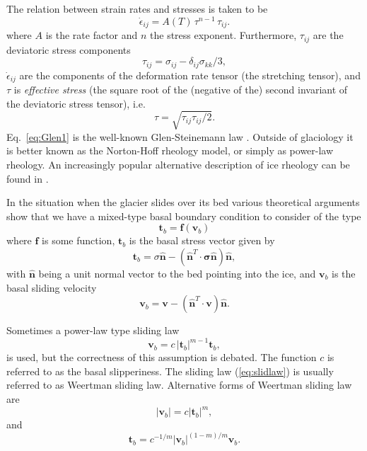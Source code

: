 \documentclass[10pt,a4paper]{book}
\newcommand{\p}{\partial}
\newcommand{\eij}{\dot{\epsilon}_{ij}}
\newcommand{\txy}{\tau_{xy}}
\newcommand{\txz}{\tau_{xz}}
\newcommand{\sxx}{\sigma_{xx}}
\newcommand{\syy}{\sigma_{yy}}
\newcommand{\szz}{\sigma_{zz}}
\newcommand{\normal}{\hat{\bm{n}}}
\begin{document}
The relation between strain rates and stresses is taken to be 
\begin{equation}
\dot{\epsilon}_{ij}=A(T) \, \tau^{n-1}\,\tau_{ij}.
\label{eq:Glen1}
\end{equation}
where $A$ is the rate factor and $n$ the stress exponent. Furthermore,
$\tau_{ij}$ are the deviatoric stress components
\[
\tau_{ij}=\sigma_{ij}- \delta_{ij} \sigma_{kk}/3, 
\]
$\eij$ are the components of the deformation rate tensor (the
stretching tensor), and $\tau$ is {\em effective stress} (the square root of the (negative of the)
second invariant of the deviatoric stress tensor), i.e.\
\[
\tau=\sqrt{ \tau_{ij} \tau_{ij}/2}.
\]
Eq.~\eqref{eq:Glen1} is the well-known Glen-Steinemann law
\cite[]{Steinemann:1954,Steinemann1958a,Steinemann1958b,Glen1955}. Outside
of glaciology it is better known as the Norton-Hoff rheology model, or
simply as power-law rheology. An increasingly popular alternative
description of ice rheology can be found in
\cite{Goldsby&Kohlstedt:2001}.


In the situation when the glacier slides over its bed various theoretical
arguments show that we have a mixed-type basal boundary condition to
consider of the type
\[ 
\bm{t}_b=\bm{f}(\bm{v}_b)
\]
where $\bm{f}$ is some function, $\bm{t}_b$ is the basal stress
vector given by
\[
\bm{t}_b=\sigma
\normal-(\normal^T \cdot \bm{\sigma} \normal)
\normal ,\] 
with $\normal$ being a unit normal vector to the bed pointing into the
ice, and $\bm{v}_b$ is the basal sliding velocity
\[
\bm{v}_b=\bm{v}-(\normal^T \cdot \bm{v}) \normal .
\]



Sometimes a power-law type sliding law 
\begin{equation}
\bm{v}_b=c\,|\bm{t}_b|^{m-1} \bm{t}_b,
\label{eq:slidlaw}
\end{equation}
is used, but the correctness of this assumption is debated.  The function $c$ is referred to as the
basal slipperiness.  The sliding law (\ref{eq:slidlaw}) is usually referred to as Weertman sliding
law. Alternative forms of Weertman sliding law are
\[
|\bm{v}_b| = c |\bm{t}_b|^m ,
\]
and
\[
\bm{t}_b=c^{-1/m} |\bm{v}_b|^{(1-m)/m} \bm{v}_b .
\]


\end{document}

